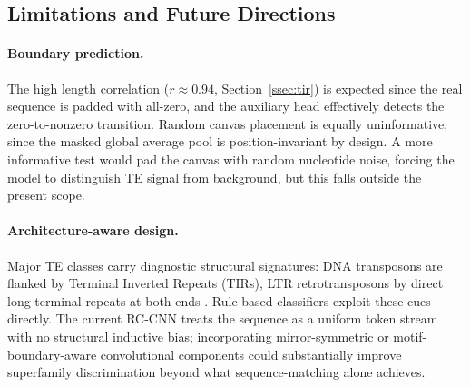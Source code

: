 \documentclass[12pt]{article}
\begin{document}

\subsection{Limitations and Future Directions}\label{ssec:limitations}

\paragraph{Boundary prediction.} The high length correlation ($r \approx 0.94$, Section~\ref{ssec:tir}) is expected since the real sequence is padded with all-zero, and the auxiliary head effectively detects the zero-to-nonzero transition. Random canvas placement is equally uninformative, since the masked global average pool is position-invariant by design. A more informative test would pad the canvas with random nucleotide noise, forcing the model to distinguish TE signal from background, but this falls outside the present scope. 

\paragraph{Architecture-aware design.} Major TE classes carry diagnostic structural signatures: DNA transposons are flanked by Terminal Inverted Repeats (TIRs), LTR retrotransposons by direct long terminal repeats at both ends \cite{wells2020field}. Rule-based classifiers exploit these cues directly. The current RC-CNN treats the sequence as a uniform token stream with no structural inductive bias; incorporating mirror-symmetric or motif-boundary-aware convolutional components could substantially improve superfamily discrimination beyond what sequence-matching alone achieves.
\end{document}
